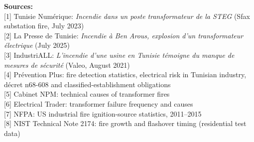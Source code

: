 \documentclass[10pt]{article}
\begin{document}
\vspace{2pt}
{\small
\textbf{Sources:}\\
{[1] Tunisie Num\'erique: \emph{Incendie dans un poste transformateur de la STEG} (Sfax substation fire, July 2023)}\\
{[2] La Presse de Tunisie: \emph{Incendie \`a Ben Arous, explosion d'un transformateur \'electrique} (July 2025)}\\
{[3] IndustriALL: \emph{L'incendie d'une usine en Tunisie t\'emoigne du manque de mesures de s\'ecurit\'e} (Valeo, August 2021)}\\
{[4] Pr\'evention Plus: fire detection statistics, electrical risk in Tunisian industry, d\'ecret n\textdegree{}68-608 and classified-establishment obligations}\\
{[5] Cabinet NPM: technical causes of transformer fires}\\
{[6] Electrical Trader: transformer failure frequency and causes}\\
{[7] NFPA: US industrial fire ignition-source statistics, 2011--2015}\\
{[8] NIST Technical Note 2174: fire growth and flashover timing (residential test data)}
}
\end{document}
